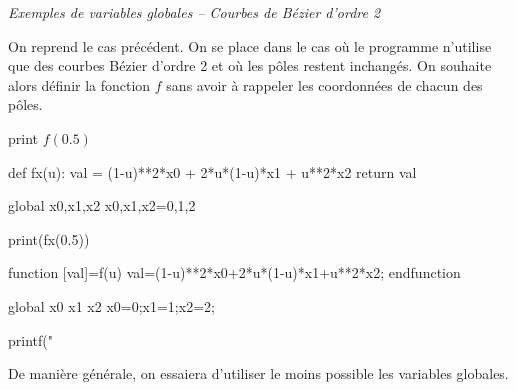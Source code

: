 \documentclass[10pt,fleqn]{article} %
\begin{document}
\begin{exemple}
\textit{Exemples de variables globales -- Courbes de Bézier d'ordre 2}

On reprend le cas précédent. On se place dans le cas où le programme n'utilise que des courbes Bézier d'ordre 2 et où les pôles restent inchangés. On souhaite alors définir la fonction $f$ sans avoir à rappeler les coordonnées de chacun des pôles.

 

\begin{pseudo}
\begin{algorithm}[H]
print $f(0.5)$
\end{algorithm}
\end{pseudo}

\begin{minipage}[c]{.48\linewidth}
\begin{py}
\begin{python}
def fx(u):
    val = (1-u)**2*x0 + 2*u*(1-u)*x1 + u**2*x2
    return val
    
global x0,x1,x2
x0,x1,x2=0,1,2

print(fx(0.5))  
\end{python}
\end{py}
\end{minipage}\hfill
\begin{minipage}[c]{.48\linewidth}
\begin{sci}
\begin{scilab}
function [val]=f(u)
  val=(1-u)**2*x0+2*u*(1-u)*x1+u**2*x2;
endfunction

global x0 x1 x2
x0=0;x1=1;x2=2;

printf("%
\end{scilab}
\end{sci}
\end{minipage}
\end{exemple}

\begin{rem}
De manière générale, on essaiera d'utiliser le moins possible les variables globales.
\end{rem}

\end{document}
